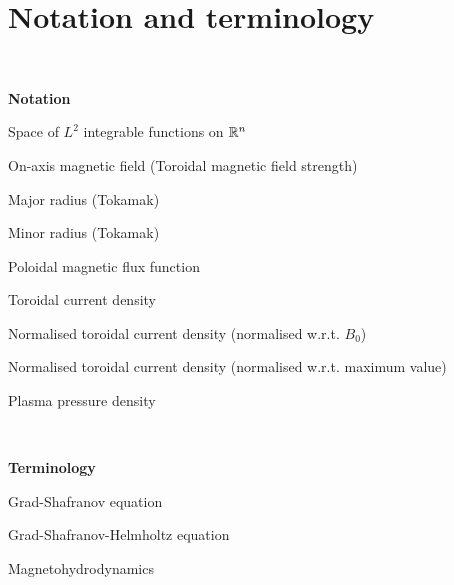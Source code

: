 

\chapter{Notation and terminology}\label{notation}

\renewcommand{\thefootnote}{\fnsymbol{footnote}}


\

\noindent\textbf{Notation}


\newcommand{\nttn}[2]{\item[{\ \makebox[3.18cm][l]{#1}}]{#2}}
\begin{list}{}{ \setlength{\leftmargin}{3.4cm}
                \setlength{\labelwidth}{3.4cm}}

\nttn{$L^2(\R^n)$}{Space of $L^2$ integrable functions on $\mathbb{R}^n$}

\nttn{$B_0$}{On-axis magnetic field (Toroidal magnetic field strength)}
\nttn{$R_0$}{Major radius (Tokamak)}
\nttn{$a$}{Minor radius (Tokamak)}
\nttn{$\psi$}{Poloidal magnetic flux function}
\nttn{$J_{\phi}$}{Toroidal current density}
\nttn{$j_{\phi}$}{Normalised toroidal current density (normalised w.r.t. $B_0$)}
\nttn{$I_{\rho}$}{Normalised toroidal current density (normalised w.r.t. maximum value)}
\nttn{$p$}{Plasma pressure density}

\end{list}

\

\noindent\textbf{Terminology}


\newcommand{\term}[2]{\item[{\ \makebox[4.58cm][l]{#1}}]{#2}}
\begin{list}{}{ \setlength{\leftmargin}{4.8cm}
                \setlength{\labelwidth}{4.8cm}}


\term{GS / GSE}{Grad-Shafranov equation}
\term{GSH}{Grad-Shafranov-Helmholtz equation}
\term{MHD}{Magnetohydrodynamics}


\end{list}
